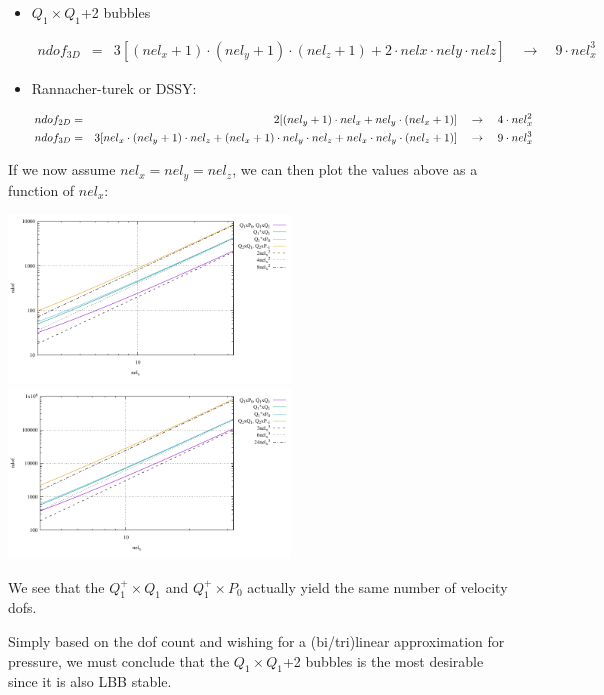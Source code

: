 \begin{itemize}
\item $Q_1 \times Q_1$+2 bubbles

\begin{eqnarray}
ndof_{3D}&=& 3[(nel_x+1) \cdot (nel_y+1) \cdot  (nel_z+1) + 2\cdot nelx\cdot nely \cdot nelz]
\quad \rightarrow \quad 9 \cdot nel_x^3 \nonumber
\end{eqnarray}


\item Rannacher-turek or DSSY:

\begin{eqnarray}
ndof_{2D}&=& 2[(nel_y+1) \cdot nel_x+nel_y\cdot(nel_x+1)  ] 
\quad\rightarrow \quad 4 \cdot nel_x^2 \nonumber\nonumber\\
ndof_{3D}&=& 3[ nel_x\cdot (nel_y+1)\cdot nel_z + (nel_x+1) \cdot nel_y\cdot nel_z  +nel_x\cdot nel_y\cdot (nel_z+1) ]  
\quad \rightarrow \quad 9 \cdot nel_x^3 \nonumber
\end{eqnarray}
 

\end{itemize}


If we now assume $nel_x=nel_y=nel_z$, we can then plot the values above as a function of $nel_x$:
\begin{center}
\includegraphics[width=7.5cm]{images/elements/ndof2D.pdf}
\includegraphics[width=7.5cm]{images/elements/ndof3D.pdf}
\end{center}

We see that the $Q_1^+\times Q_1$ and $Q_1^+ \times P_0$ actually 
yield the same number of velocity dofs. 

Simply based on the dof count and wishing for a (bi/tri)linear approximation 
for pressure, we must conclude that the $Q_1\times Q_1$+2 bubbles is the most desirable 
since it is also LBB stable.

